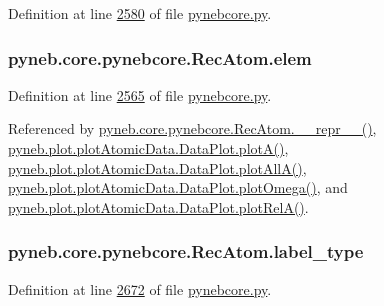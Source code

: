 Definition at line \hyperlink{pynebcore_8py_source_l02580}{2580} of file \hyperlink{pynebcore_8py_source}{pynebcore.\+py}.

\hypertarget{classpyneb_1_1core_1_1pynebcore_1_1_rec_atom_a1325fff2854658752d522c7284df5a8a}{}
\subsubsection[{elem}]{\setlength{\rightskip}{0pt plus 5cm}pyneb.\+core.\+pynebcore.\+Rec\+Atom.\+elem}\label{classpyneb_1_1core_1_1pynebcore_1_1_rec_atom_a1325fff2854658752d522c7284df5a8a}


Definition at line \hyperlink{pynebcore_8py_source_l02565}{2565} of file \hyperlink{pynebcore_8py_source}{pynebcore.\+py}.



Referenced by \hyperlink{pynebcore_8py_source_l03032}{pyneb.\+core.\+pynebcore.\+Rec\+Atom.\+\_\+\+\_\+repr\+\_\+\+\_\+()}, \hyperlink{plot_atomic_data_8py_source_l00116}{pyneb.\+plot.\+plot\+Atomic\+Data.\+Data\+Plot.\+plot\+A()}, \hyperlink{plot_atomic_data_8py_source_l00188}{pyneb.\+plot.\+plot\+Atomic\+Data.\+Data\+Plot.\+plot\+All\+A()}, \hyperlink{plot_atomic_data_8py_source_l00372}{pyneb.\+plot.\+plot\+Atomic\+Data.\+Data\+Plot.\+plot\+Omega()}, and \hyperlink{plot_atomic_data_8py_source_l00261}{pyneb.\+plot.\+plot\+Atomic\+Data.\+Data\+Plot.\+plot\+Rel\+A()}.

\hypertarget{classpyneb_1_1core_1_1pynebcore_1_1_rec_atom_a054cc66819a590792e6a2478136e2143}{}
\subsubsection[{label\+\_\+type}]{\setlength{\rightskip}{0pt plus 5cm}pyneb.\+core.\+pynebcore.\+Rec\+Atom.\+label\+\_\+type}\label{classpyneb_1_1core_1_1pynebcore_1_1_rec_atom_a054cc66819a590792e6a2478136e2143}


Definition at line \hyperlink{pynebcore_8py_source_l02672}{2672} of file \hyperlink{pynebcore_8py_source}{pynebcore.\+py}.



